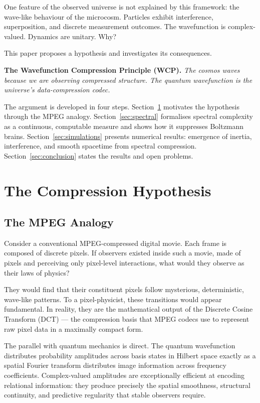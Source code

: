 \documentclass[11pt]{article}
\begin{document}
One feature of the observed universe is not explained by this framework:
the wave-like behaviour of the microcosm. Particles exhibit interference,
superposition, and discrete measurement outcomes. The wavefunction is
complex-valued. Dynamics are unitary. Why?

This paper proposes a hypothesis and investigates its consequences.

\textbf{The Wavefunction Compression Principle (WCP).}
\textit{The cosmos waves because we are observing compressed structure.
The quantum wavefunction is the universe's data-compression codec.}

The argument is developed in four steps. Section~\ref{sec:analogy}
motivates the hypothesis through the MPEG analogy.
Section~\ref{sec:spectral} formalises spectral complexity as a
continuous, computable measure and shows how it suppresses Boltzmann
brains. Section~\ref{sec:simulations} presents numerical results:
emergence of inertia, interference, and smooth spacetime from spectral
compression. Section~\ref{sec:conclusion} states the results and open
problems.

\section{The Compression Hypothesis}
\label{sec:analogy}

\subsection{The MPEG Analogy}

Consider a conventional MPEG-compressed digital movie. Each frame is
composed of discrete pixels. If observers existed inside such a
movie, made of pixels and perceiving only pixel-level interactions, what
would they observe as their laws of physics?

They would find that their constituent pixels follow mysterious,
deterministic, wave-like patterns. To a pixel-physicist, these transitions
would appear fundamental. In reality, they are the mathematical output of
the Discrete Cosine Transform (DCT) --- the compression basis that MPEG
codecs use to represent raw pixel data in a maximally compact form.

The parallel with quantum mechanics is direct. The quantum wavefunction
distributes probability amplitudes across basis states in Hilbert space
exactly as a spatial Fourier transform distributes image information across
frequency coefficients. Complex-valued amplitudes are exceptionally
efficient at encoding relational information: they produce precisely the
spatial smoothness, structural continuity, and predictive regularity that
stable observers require.
\end{document}
